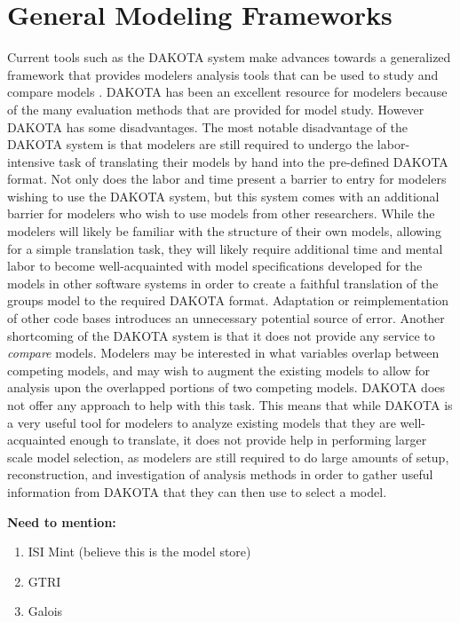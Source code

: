 \section{General Modeling Frameworks\label{sec:gen_model_frameworks}}
Current tools such as the DAKOTA system make advances towards a generalized framework that provides modelers analysis tools that can be used to study and compare models \citep{adams2009dakota}.
DAKOTA has been an excellent resource for modelers because of the many evaluation methods that are provided for model study.
However DAKOTA has some disadvantages.
The most notable disadvantage of the DAKOTA system is that modelers are still required to undergo the labor-intensive task of translating their models by hand into the pre-defined DAKOTA format.
Not only does the labor and time present a barrier to entry for modelers wishing to use the DAKOTA system, but this system comes with an additional barrier for modelers who wish to use models from other researchers.
While the modelers will likely be familiar with the structure of their own models, allowing for a simple translation task, they will likely require additional time and mental labor to become well-acquainted with model specifications developed for the models in other software systems in order to create a faithful translation of the groups model to the required DAKOTA format.
Adaptation or reimplementation of other code bases introduces an unnecessary potential source of error.
Another shortcoming of the DAKOTA system is that it does not provide any service to \emph{compare} models.
Modelers may be interested in what variables overlap between competing models, and may wish to augment the existing models to allow for analysis upon the overlapped portions of two competing models.
DAKOTA does not offer any approach to help with this task.
This means that while DAKOTA is a very useful tool for modelers to analyze existing models that they are well-acquainted enough to translate, it does not provide help in performing larger scale model selection, as modelers are still required to do large amounts of setup, reconstruction, and investigation of analysis methods in order to gather useful information from DAKOTA that they can then use to select a model.

\textbf{Need to mention:}
\begin{enumerate}
  \item ISI Mint (believe this is the model store)
  \item GTRI
  \item Galois
\end{enumerate}
